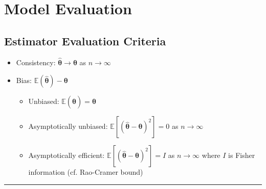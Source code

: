 \section{Model Evaluation}
\subsection*{Estimator Evaluation Criteria}
\begin{itemize}
    \item Consistency: $\hat{\boldsymbol{\theta}} \rightarrow \boldsymbol{\theta}$ as $n \rightarrow \infty$
    \item Bias: $\mathbb{E}(\hat{\boldsymbol{\theta}}) - \boldsymbol{\theta}$
    \begin{itemize}
        \item Unbiased: $\mathbb{E}(\hat{\boldsymbol{\theta}}) = \boldsymbol{\theta}$
        \item Asymptotically unbiased: $\mathbb{E} [ ( \hat{\boldsymbol{\theta}} - \boldsymbol{\theta} )^2 ] = 0$ as $n \rightarrow \infty$ 
        \item Asymptotically efficient: $\mathbb{E} [ ( \hat{\boldsymbol{\theta}} - \boldsymbol{\theta} )^2 ] = I$ as $n \rightarrow \infty$  where $I$ is Fisher information (cf. Rao-Cramer bound)
    \end{itemize}
\end{itemize}

{\color{black}\hrule height 0.001mm}


